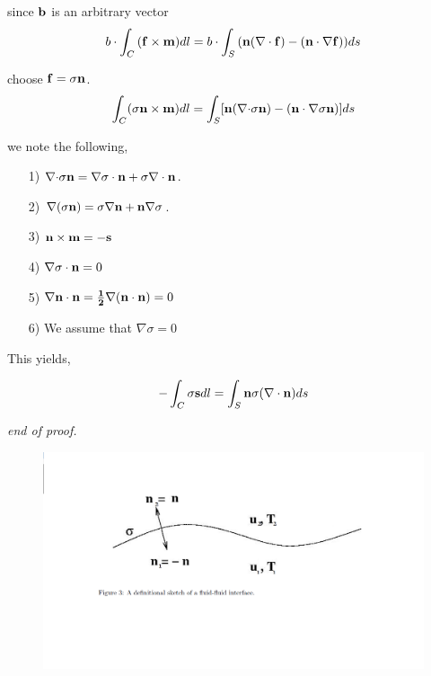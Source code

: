 \documentclass{article}
\begin{document}
since ${\bf b}$ is an arbitrary vector 
\begin{equation}
b \cdot \int_C {\bf  (f \times m)}dl = b \cdot \int_S {\bf (n(\nabla \cdot f) - ( n \cdot \nabla f))}ds
\end{equation}

choose ${\bf f} =\sigma{\bf n}$.
\begin{equation}
\int_C (\sigma{\bf n \times m})dl = \int_S[{\bf n(\nabla \cdot}\sigma{\bf n) - (n \cdot \nabla}\sigma{\bf n})] ds
\end{equation} 

we note the following, 
\begin{itemize}
\item[1)]$ {\bf \nabla \cdot}\sigma {\bf n} = \nabla \sigma \cdot {\bf n} + \sigma {\bf \nabla \cdot n}$. 
\item[2)]$ {\bf \nabla }(\sigma {\bf n}) = \sigma {\bf \nabla n  +  n\nabla }\sigma$.
\item[3)]$ {\bf n \times m = -s}$ 
\item[4)]$ \nabla \sigma \cdot {\bf n} = 0 $
\item[5)]$ {\bf \nabla n \cdot n = \frac{1}{2}\nabla (n \cdot n)} = 0 $
\item[6)] We assume that $\nabla \sigma = 0 $
\end{itemize}

This yields, \newline

\begin{equation*}
-\int_C \sigma {\bf s}dl = \int_S{\bf n }\sigma {\bf (\nabla \cdot n)} ds
\end{equation*}

 \textit{end of proof. }
 \begin{figure}[H] 
  \includegraphics[width=6.5in]{interface2.png}
\end{figure}
\newpage
\end{document}
